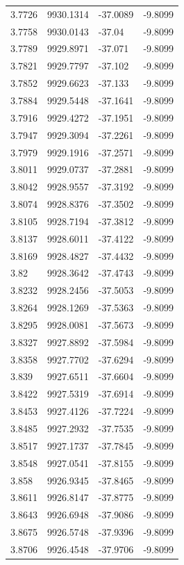 \begin{table}[H]
\begin{tabular}{llll}
3.7726 & 9930.1314 & -37.0089 & -9.8099 \\
3.7758 & 9930.0143 & -37.04 & -9.8099 \\
3.7789 & 9929.8971 & -37.071 & -9.8099 \\
3.7821 & 9929.7797 & -37.102 & -9.8099 \\
3.7852 & 9929.6623 & -37.133 & -9.8099 \\
3.7884 & 9929.5448 & -37.1641 & -9.8099 \\
3.7916 & 9929.4272 & -37.1951 & -9.8099 \\
3.7947 & 9929.3094 & -37.2261 & -9.8099 \\
3.7979 & 9929.1916 & -37.2571 & -9.8099 \\
3.8011 & 9929.0737 & -37.2881 & -9.8099 \\
3.8042 & 9928.9557 & -37.3192 & -9.8099 \\
3.8074 & 9928.8376 & -37.3502 & -9.8099 \\
3.8105 & 9928.7194 & -37.3812 & -9.8099 \\
3.8137 & 9928.6011 & -37.4122 & -9.8099 \\
3.8169 & 9928.4827 & -37.4432 & -9.8099 \\
3.82 & 9928.3642 & -37.4743 & -9.8099 \\
3.8232 & 9928.2456 & -37.5053 & -9.8099 \\
3.8264 & 9928.1269 & -37.5363 & -9.8099 \\
3.8295 & 9928.0081 & -37.5673 & -9.8099 \\
3.8327 & 9927.8892 & -37.5984 & -9.8099 \\
3.8358 & 9927.7702 & -37.6294 & -9.8099 \\
3.839 & 9927.6511 & -37.6604 & -9.8099 \\
3.8422 & 9927.5319 & -37.6914 & -9.8099 \\
3.8453 & 9927.4126 & -37.7224 & -9.8099 \\
3.8485 & 9927.2932 & -37.7535 & -9.8099 \\
3.8517 & 9927.1737 & -37.7845 & -9.8099 \\
3.8548 & 9927.0541 & -37.8155 & -9.8099 \\
3.858 & 9926.9345 & -37.8465 & -9.8099 \\
3.8611 & 9926.8147 & -37.8775 & -9.8099 \\
3.8643 & 9926.6948 & -37.9086 & -9.8099 \\
3.8675 & 9926.5748 & -37.9396 & -9.8099 \\
3.8706 & 9926.4548 & -37.9706 & -9.8099 \\

\end{tabular}
\end{table}
